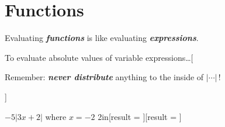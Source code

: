 \section{Functions}

\begin{tcolorbox}[center,width=5in,]
    \centering
    Evaluating {\bfseries\itshape functions} is like evaluating {\bfseries\itshape expressions}. 
\end{tcolorbox}


\begin{myConceptSteps}{To evaluate absolute values of variable expressions\dots}[
    \begin{tcolorbox}[center,width=5in,colback=white,]
        \centering
        Remember: {\bfseries\itshape never distribute} anything to the inside of $|\cdots|$\,!
    \end{tcolorbox}
]
\end{myConceptSteps}

{
    $-5|3x+2|$ \quad where $x=-2$
}{2in}[{\raggedleft result = }][{\raggedleft result = }]
